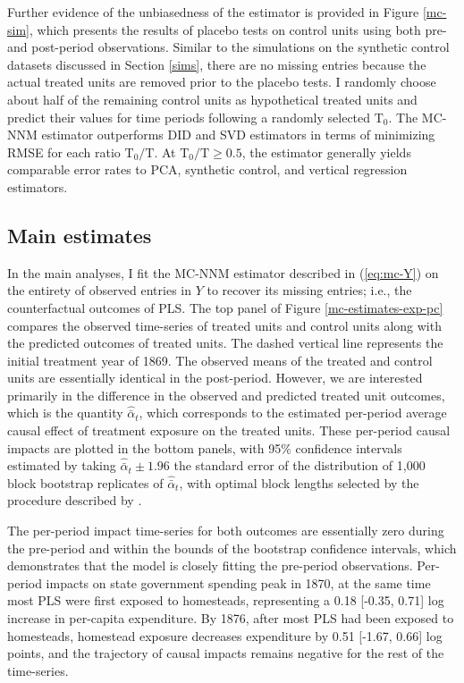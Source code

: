 Further evidence of the unbiasedness of the estimator is provided in Figure \ref{mc-sim}, which presents the results of placebo tests on control units using both pre- and post-period observations. Similar to the simulations on the synthetic control datasets discussed in Section \ref{sims}, there are no missing entries because the actual treated units are removed prior to the placebo tests. I randomly choose about half of the remaining control units as hypothetical treated units and predict their values for time periods following a randomly selected $\text{T}_0$. The MC-NNM estimator outperforms DID and SVD estimators in terms of minimizing RMSE for each ratio $\text{T}_0/\text{T}$. At $\text{T}_0/\text{T} \geq 0.5$, the estimator generally yields comparable error rates to PCA, synthetic control, and vertical regression estimators. 

\subsection{Main estimates} \label{main-estimates}

In the main analyses, I fit the MC-NNM estimator described in (\ref{eq:mc-Y}) on the entirety of observed entries in $Y$ to recover its missing entries; i.e., the counterfactual outcomes of PLS. The top panel of Figure \ref{mc-estimates-exp-pc} compares the observed time-series of treated units and control units along with the predicted outcomes of treated units. The dashed vertical line represents the initial treatment year of 1869. The observed means of the treated and control units are essentially identical in the post-period. However, we are interested primarily in the difference in the observed and predicted treated unit outcomes, which is the quantity $\hat{\bar{\alpha}}_{t}$, which corresponds to the estimated per-period average causal effect of treatment exposure on the treated units. These per-period causal impacts are plotted in the bottom panels, with 95\% confidence intervals estimated by taking $\hat{\bar{\alpha}}_{t} \pm 1.96$ the standard error of the distribution of 1,000 block bootstrap replicates of $\hat{\bar{\alpha}}_{t}$, with optimal block lengths selected by the procedure described by \citet{politis2004automatic}. 

The per-period impact time-series for both outcomes are essentially zero during the pre-period and within the bounds of the bootstrap confidence intervals, which demonstrates that the model is closely fitting the pre-period observations. Per-period impacts on state government spending peak in 1870, at the same time most PLS were first exposed to homesteads, representing a 0.18 [-0.35, 0.71] log increase in per-capita expenditure. By 1876, after most PLS had been exposed to homesteads, homestead exposure decreases expenditure by 0.51 [-1.67, 0.66] log points, and the trajectory of causal impacts remains negative for the rest of the time-series.

